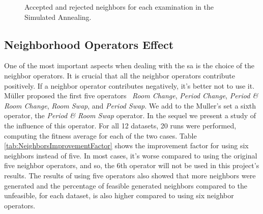 \begin{figure}[t!]
\centering


\caption{Accepted and rejected neighbors for each examination in the Simulated Annealing.}
\label{fig:AvsRNeighbors} 
\end{figure}
\subsection{Neighborhood Operators Effect}
One of the most important aspects when dealing with the \gls{sa} is the choice of the neighbor operators. It is crucial that all the neighbor operators contribute positively. If a neighbor operator contributes negatively, it's better not to use it. M\"{u}ller proposed the first five operators~\cite{Mueller2009} \textit{Room Change}, \textit{Period Change}, \textit{Period \& Room Change}, \textit{Room Swap}, and \textit{Period Swap}. We add to the Muller's set a sixth operator, the \textit{Period \& Room Swap} operator. In the sequel we present a study of the influence of this operator. For all 12 datasets, 20 runs were performed, computing the fitness average for each of the two cases. Table \ref{tab:NeighborsImprovementFactor} shows the improvement factor for using six neighbors instead of five. In most cases, it's worse compared to using the original five neighbor operators, and so, the 6th operator will not be used in this project's results. The results of using five operators also showed that more neighbors were generated and the percentage of feasible generated neighbors compared to the unfeasible, for each dataset, is also higher compared to using six neighbor operators.

